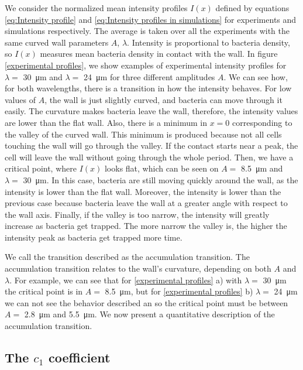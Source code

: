 We consider the normalized mean intensity profiles $I(x)$ defined by equations \eqref{eq:Intensity profile} and \eqref{eq:Intensity profiles in simulations} for experiments and simulations respectively. The average is taken over all the experiments with the same curved wall parameters $A$, $\lambda$. Intensity is proportional to bacteria density, so $I(x)$ measures mean bacteria density in contact with the wall. In figure \ref{experimental profiles}, we show examples of experimental intensity profiles for $\lambda=$ \SI{30}{\micro\meter} and $\lambda= $ \SI{24}{\micro\meter} for three different amplitudes $A$. We can see how, for both wavelengths, there is a transition in how the intensity behaves. For low values of $A$, the wall is just slightly curved, and bacteria can move through it easily. The curvature makes bacteria leave the wall, therefore, the intensity values are lower than the flat wall. Also, there is a minimum in $x=0$ corresponding to the valley of the curved wall. This minimum is produced because not all cells touching the wall will go through the valley. If the contact starts near a peak, the cell will leave the wall without going through the whole period. Then, we have a critical point, where $I(x)$ looks flat, which can be seen on $A=$ \SI{8.5}{\micro\meter} and $\lambda= $ \SI{30}{\micro\meter}. In this case, bacteria are still moving quickly around the wall, as the intensity is lower than the flat wall. Moreover, the intensity is lower than the previous case because bacteria leave the wall at a greater angle with respect to the wall axis. Finally, if the valley is too narrow, the intensity will greatly increase as bacteria get trapped. The more narrow the valley is, the higher the intensity peak as bacteria get trapped more time.

We call the transition described as the accumulation transition. The accumulation transition relates to the wall's curvature, depending on both $A$ and $\lambda$. For example, we can see that for \ref{experimental profiles} a) with $\lambda= $ \SI{30}{\micro\meter} the  critical point is in $A=$ \SI{8.5}{\micro\meter}, but for \ref{experimental profiles} b) $\lambda=$ \SI{24}{\micro\meter} we can not see the behavior described an so the critical point must be between $A=$ \SI{2.8}{\micro\meter} and \SI{5.5}{\micro\meter}. We now present a quantitative description of the accumulation transition.

\subsection{The $c_1$ coefficient}

